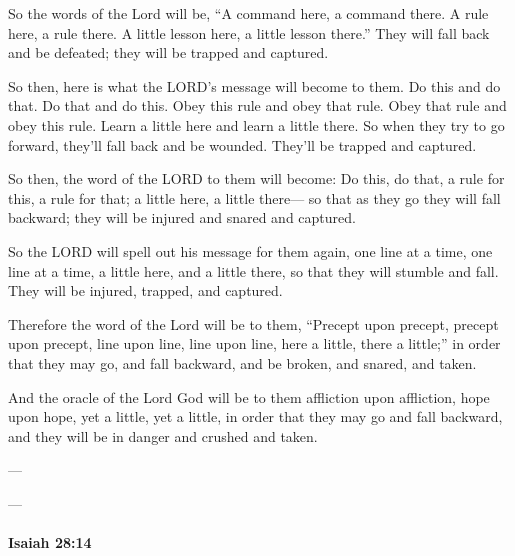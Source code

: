\begin{framed}
\begin{compactdesc}
					\item[NCV] So the words of the Lord will be, ``A command here, a command there. A rule here, a rule there. A little lesson here, a little lesson there.'' They will fall back and be defeated; they will be trapped and captured.
					\item[NIRV] So then, here is what the LORD's message will become to them. Do this and do that. Do that and do this. Obey this rule and obey that rule. Obey that rule and obey this rule. Learn a little here and learn a little there. So when they try to go forward, they'll fall back and be wounded. They'll be trapped and captured.
					\item[NIV] So then, the word of the LORD to them will become: Do this, do that, a rule for this, a rule for that; a little here, a little there--- so that as they go they will fall backward; they will be injured and snared and captured.
					\item[NLT] So the LORD will spell out his message for them again, one line at a time, one line at a time, a little here, and a little there, so that they will stumble and fall. They will be injured, trapped, and captured.
					\item[NRSV] Therefore the word of the Lord will be to them, ``Precept upon precept, precept upon precept, line upon line, line upon line, here a little, there a little;'' in order that they may go, and fall backward, and be broken, and snared, and taken.
					\item[NETS] And the oracle of the Lord God will be to them affliction upon affliction, hope upon hope, yet a little, yet a little, in order that they may go and fall backward, and they will be in danger and crushed and taken.
					\item[OTR1] ---
					\item[OTR2] ---
				\end{compactdesc}
			\end{framed}

		\paragraph{Isaiah 28:14} %
			\label{ISAIAH-28-14}

